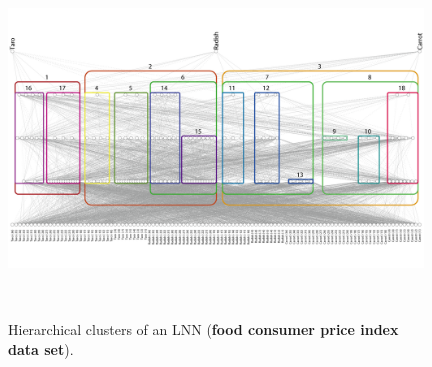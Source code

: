 \documentclass{article}
\begin{document}
\begin{figure}[t]
\centering
\includegraphics[width=110mm]{food_align_lnn.png}\vspace{-0.05\hsize}
\caption{Hierarchical clusters of an LNN (\textbf{food consumer price index data set}). }\vspace{0.01\hsize}
\label{fig:food_align_lnn}
\begin{minipage}{0.66\hsize}
\hspace{8mm}
\end{minipage}
\hspace{-9mm}
\begin{minipage}{0.33\hsize}
\\
\end{minipage}
\begin{minipage}{0.66\hsize}
\hspace{8mm}

\end{minipage}
\end{figure}
\end{document}
